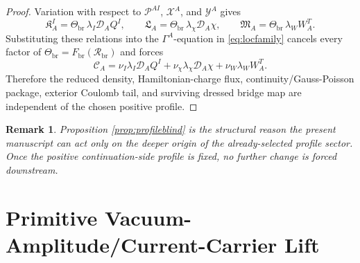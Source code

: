 \documentclass[11pt]{article}
\newcommand{\SpatialD}{\mathcal D}
\newcommand{\ConstCurrent}{\mathcal C}
\newcommand{\ConstGamma}{\Gamma}
\newcommand{\CurvQMult}{\mathscr P}
\newcommand{\CurvChiMult}{\mathscr X}
\newcommand{\CurvTransMult}{\mathscr Y}
\newcommand{\CurvSeed}{\Theta_{\mathrm{br}}}
\newcommand{\CurvProfile}{F_{\mathrm{br}}}
\newcommand{\CurvOneI}{\mathfrak K}
\newcommand{\CurvOneChi}{\mathfrak L}
\newcommand{\CurvOneW}{\mathfrak M}
\newcommand{\BridgeCurv}{\mathcal R_{\mathrm{br}}}
\newtheorem{remark}{Remark}
\begin{document}
\begin{proof}
Variation with respect to \(\CurvQMult^{AI}\), \(\CurvChiMult^A\), and \(\CurvTransMult^A\) gives
\[
\CurvOneI_A^I=\CurvSeed\,\lambda_I\SpatialD_AQ^I,
\qquad
\CurvOneChi_A=\CurvSeed\,\lambda_\chi\SpatialD_A\chi,
\qquad
\CurvOneW_A=\CurvSeed\,\lambda_WW_A^T.
\]
Substituting these relations into the \(\ConstGamma^A\)-equation in \eqref{eq:locfamily} cancels every factor of \(\CurvSeed=\CurvProfile(\BridgeCurv)\) and forces
\[
\ConstCurrent_A
=
\nu_I\lambda_I\SpatialD_AQ^I
+\nu_\chi\lambda_\chi\SpatialD_A\chi
+\nu_W\lambda_WW_A^T.
\]
Therefore the reduced density, Hamiltonian-charge flux, continuity/Gauss-Poisson package, exterior Coulomb tail, and surviving dressed bridge map are independent of the chosen positive profile.
\end{proof}

\begin{remark}
Proposition \ref{prop:profileblind} is the structural reason the present manuscript can act only on the deeper origin of the already-selected profile sector. Once the positive continuation-side profile is fixed, no further change is forced downstream.
\end{remark}

\section{Primitive Vacuum-Amplitude/Current-Carrier Lift}
\end{document}
